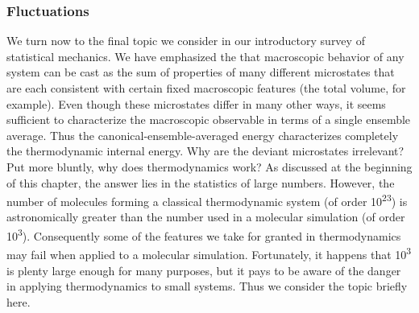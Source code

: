 \documentclass[]{article}
\begin{document}
\subsubsection{Fluctuations}\label{fluctuations}

We turn now to the final topic we consider in our introductory survey of
statistical mechanics. We have emphasized the that macroscopic behavior
of any system can be cast as the sum of properties of many different
microstates that are each consistent with certain fixed macroscopic
features (the total volume, for example). Even though these microstates
differ in many other ways, it seems sufficient to characterize the
macroscopic observable in terms of a single ensemble average. Thus the
canonical-ensemble-averaged energy characterizes completely the
thermodynamic internal energy. Why are the deviant microstates
irrelevant? Put more bluntly, why does thermodynamics work? As discussed
at the beginning of this chapter, the answer lies in the statistics of
large numbers. However, the number of molecules forming a classical
thermodynamic system (of order 10\textsuperscript{23}) is astronomically
greater than the number used in a molecular simulation (of order
10\textsuperscript{3}). Consequently some of the features we take for
granted in thermodynamics may fail when applied to a molecular
simulation. Fortunately, it happens that 10\textsuperscript{3} is plenty
large enough for many purposes, but it pays to be aware of the danger in
applying thermodynamics to small systems. Thus we consider the topic
briefly here.
\end{document}
